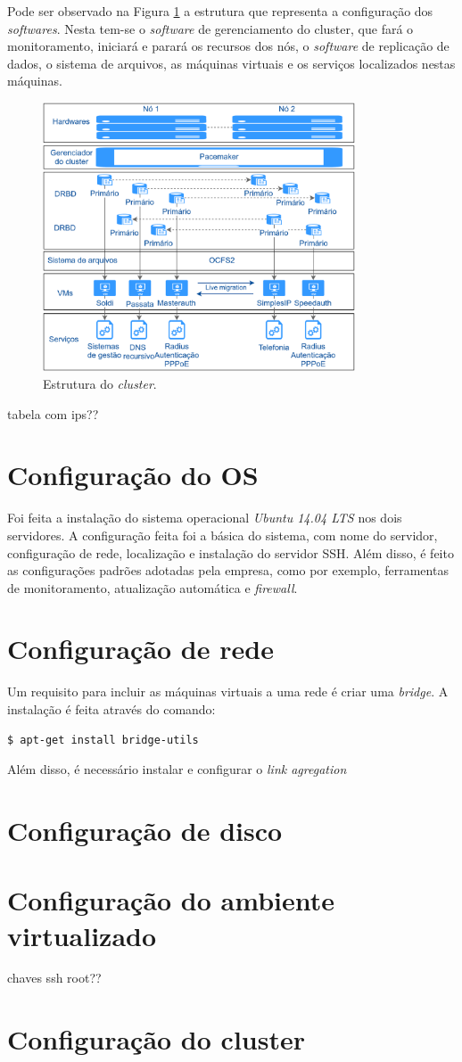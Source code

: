 Pode ser observado na Figura \ref{fig:projeto_estrutura} a estrutura que representa a configuração dos \textit{softwares}. Nesta tem-se o 
\textit{software} de gerenciamento do cluster, que fará o monitoramento, iniciará e parará os recursos dos nós, o \textit{software} de replicação 
de dados, o sistema de arquivos, as máquinas virtuais e os serviços localizados nestas máquinas.

\begin{figure}[h!]
 \centering
 \includegraphics[width=350px]{img/projeto_estrutura.eps}
 \caption{Estrutura do \textit{cluster}.}
 \label{fig:projeto_estrutura}
\end{figure}

tabela com ips??

\section{Configuração do \ac{OS}}

Foi feita a instalação do sistema operacional \textit{Ubuntu 14.04 \ac{LTS}} nos dois servidores. A configuração feita foi a básica do sistema,
com nome do servidor, configuração de rede, localização e instalação do servidor \ac{SSH}.
Além disso, é feito as configurações padrões adotadas pela empresa, como por exemplo, ferramentas de monitoramento, atualização automática
e \textit{firewall}.

\section{Configuração de rede}

Um requisito para incluir as máquinas virtuais a uma rede é criar uma \textit{bridge}. A instalação é feita através do comando:
\begin{lstlisting}[language=bash]
  $ apt-get install bridge-utils
\end{lstlisting}

Além disso, é necessário instalar e configurar o \textit{link agregation}

\section{Configuração de disco}


\section{Configuração do ambiente virtualizado}

chaves ssh root??

\section{Configuração do cluster}

